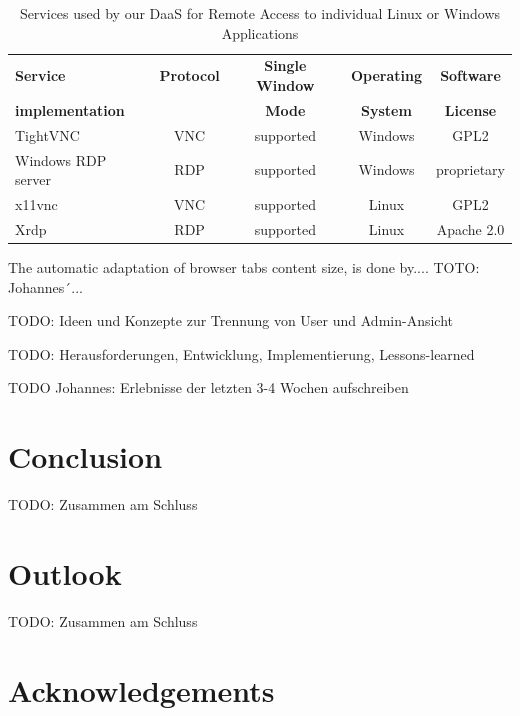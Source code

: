 \documentclass[runningheads]{llncs}
\begin{document}
\begin{table}
	\centering
	\caption{Services used by our DaaS for Remote Access to individual Linux or Windows Applications}
	\begin{tabular}{|l|c|c|c|c|}
		\hline
		\textbf{Service}    &  \textbf{Protocol}  & \textbf{Single Window}       & \textbf{Operating} & \textbf{Software}  \\
		\textbf{implementation}  &                & \textbf{Mode}                & \textbf{System}    & \textbf{License}   \\
		\hline
		TightVNC            &  VNC                & supported                    & Windows            & GPL2               \\
		\hline
		Windows RDP server  &  RDP                & supported                    & Windows            & proprietary        \\
		\hline
		x11vnc              &  VNC                & supported                    & Linux              & GPL2               \\
		\hline
		Xrdp                &  RDP                & supported                    & Linux              & Apache 2.0         \\
		\hline
	\end{tabular}
	\label{tab:DaaS_Services_Overview}
\end{table}

The automatic adaptation of browser tabs content size, is done by.... TOTO: Johannes´...

TODO: Ideen und Konzepte zur Trennung von User und Admin-Ansicht

TODO: Herausforderungen, Entwicklung, Implementierung, Lessons-learned

TODO Johannes: Erlebnisse der letzten 3-4 Wochen aufschreiben



\section{Conclusion}
\label{sec:Conclusions}

TODO: Zusammen am Schluss

\section{Outlook}
\label{sec:NextSteps}

TODO: Zusammen am Schluss

\section*{Acknowledgements}
\end{document}
